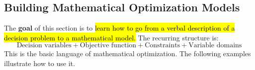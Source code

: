 \subsection{Building Mathematical Optimization Models}\label{sec:introduction:building-mathematical-optimization-models}

The \textbf{goal} of this section is to \hl{learn how to go from a verbal description of a decision problem to a mathematical model.} The recurring structure is:
\begin{equation*}
    \text{Decision variables}
    +
    \text{Objective function}
    +
    \text{Constraints}
    +
    \text{Variable domains}
\end{equation*}
This is the basic language of mathematical optimization. The following examples illustrate how to use it.

